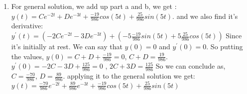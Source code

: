 \documentclass[10pt,a4paper, margin=1in]{article}
\begin{document}
\begin{enumerate}
\begin{enumerate}
    
	\item For general solution, we add up part a and b, we get : \newline
    $y(t)= Ce^{-2t} + De^{-3t} + \frac{-19}{986}cos(5t)+ \frac{25}{986}sin(5t)$. and we also find it's derivative: \newline
    $y^{'}(t)= (-2Ce^{-2t}  -3De^{-3t}) + (-5\frac{-19}{986}sin(5t)+ 5\frac{25}{986}cos(5t))$ Since it's initially at rest. We can say that $y(0)=0$ and $y^{'}(0)=0$. So putting the values, $y(0)= C + D + \frac{-19}{986} =0 $, $ C+ D =\frac{19}{986}$. \newline
    $y^{'}(0)= -2C -3D + \frac{125}{986}=0$ , $2C+3D=\frac{125}{986}$ \newline
    So we can conclude as, $C=\frac{-70}{986}$, $D=\frac{89}{986}$. applying it to the general solution we get: \newline
    $y(t)= \frac{-70}{986}e^{-2t} + \frac{89}{986}e^{-3t} + \frac{-19}{986}cos(5t)+ \frac{25}{986}sin(5t)$
    
    
 
 
 
 
    \end{enumerate}    
    

\end{enumerate}
\end{document}
